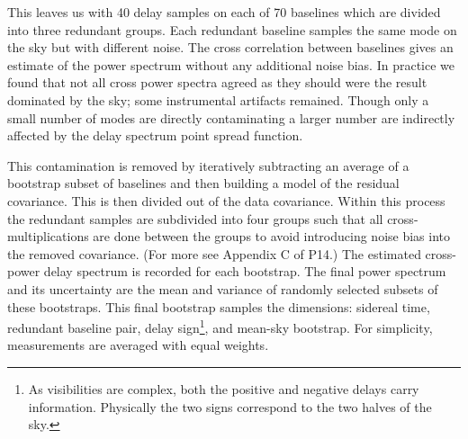 \documentclass[preprint2]{aastex}
\begin{document}
This leaves us with 40 delay samples on each of 70 baselines which are divided into three redundant groups.  Each redundant baseline samples the same mode on the sky but with different noise. The cross correlation between baselines gives an estimate of the power spectrum without any additional noise bias. In practice we found that not all cross power spectra agreed as they should were the result dominated by the sky; some instrumental artifacts remained. Though only a small number of modes are directly contaminating a larger number are indirectly affected by the delay spectrum point spread function.

This contamination is removed by iteratively subtracting an average of a bootstrap subset of baselines and then building a model of the residual covariance. This is then divided out of the data covariance.  Within this process the redundant samples are subdivided into four groups such that all cross-multiplications are done between the groups to avoid introducing noise bias into the removed covariance. (For more see Appendix C of P14.)  The estimated cross-power delay spectrum is recorded for each bootstrap.  The final power spectrum and its uncertainty are the mean and variance of randomly selected subsets of these bootstraps. This final bootstrap samples the dimensions: sidereal time, redundant baseline pair, delay sign\footnote{As visibilities are complex, both the positive and negative delays  carry  information. Physically the two signs correspond to the two halves of the sky.}, and mean-sky bootstrap. For simplicity, measurements are averaged with equal weights.
\end{document}
